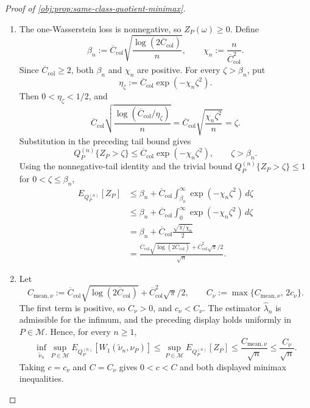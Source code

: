 \begin{proof}[Proof of \cref{obj:prop:same-class-quotient-minimax}]
\begin{enumerate}
\item
The one-Wasserstein loss is nonnegative, so \(Z_P(\omega)\ge0\). Define
\[
  \beta_n:=
  \overline C_{\mathrm{col}}
  \sqrt{\frac{\log(2\overline C_{\mathrm{col}})}{n}},
  \qquad
  \chi_n:=
  \frac{n}{\overline C_{\mathrm{col}}^2}.
\]
Since \(\overline C_{\mathrm{col}}\ge2\), both \(\beta_n\) and \(\chi_n\) are positive. For every \(\zeta>\beta_n\), put
\[
  \eta_\zeta:=
  \overline C_{\mathrm{col}}\exp(-\chi_n\zeta^2).
\]
Then \(0<\eta_\zeta<1/2\), and
\[
  \overline C_{\mathrm{col}}
  \sqrt{\frac{\log(\overline C_{\mathrm{col}}/\eta_\zeta)}{n}}
  =
  \overline C_{\mathrm{col}}
  \sqrt{\frac{\chi_n\zeta^2}{n}}
  =
  \zeta .
\]
Substitution in the preceding tail bound gives
\[
  Q_P^{(n)}\{Z_P>\zeta\}
  \le
  \overline C_{\mathrm{col}}\exp(-\chi_n\zeta^2),
  \qquad \zeta>\beta_n .
\]
Using the nonnegative-tail identity and the trivial bound
\(Q_P^{(n)}\{Z_P>\zeta\}\le1\) for \(0<\zeta\le\beta_n\),
\[
\begin{aligned}
  E_{Q_P^{(n)}}[Z_P]
  &\le
  \beta_n+
  \overline C_{\mathrm{col}}
  \int_{\beta_n}^{\infty}\exp(-\chi_n\zeta^2)\,d\zeta  \\
  &\le
  \beta_n+
  \overline C_{\mathrm{col}}
  \int_{0}^{\infty}\exp(-\chi_n\zeta^2)\,d\zeta  \\
  &=
  \beta_n+
  \overline C_{\mathrm{col}}\frac{\sqrt{\pi/\chi_n}}{2}  \\
  &=
  \frac{
    \overline C_{\mathrm{col}}\sqrt{\log(2\overline C_{\mathrm{col}})}
    +
    \overline C_{\mathrm{col}}^2\sqrt{\pi}/2
  }{\sqrt n}.
\end{aligned}
\]

\item
Let
\[
  C_{\mathrm{mean},\nu}:=
  \overline C_{\mathrm{col}}\sqrt{\log(2\overline C_{\mathrm{col}})}
  +
  \overline C_{\mathrm{col}}^2\sqrt{\pi}/2,
  \qquad
  C_{\nu}:=\max\{C_{\mathrm{mean},\nu},\,2c_{\nu}\}.
\]
The first term is positive, so \(C_{\nu}>0\), and \(c_{\nu}<C_{\nu}\). The estimator \(\widehat\lambda_n\) is admissible for the infimum, and the preceding display holds uniformly in \(P\in\mathcal M\). Hence, for every \(n\ge1\),
\[
  \inf_{\widetilde\nu_n}
  \sup_{P\in\mathcal M}
  E_{Q_P^{(n)}}\!\left[
    W_1\!\left(\widetilde\nu_n,\nu_P\right)
  \right]
  \le
  \sup_{P\in\mathcal M} E_{Q_P^{(n)}}[Z_P]
  \le
  \frac{C_{\mathrm{mean},\nu}}{\sqrt n}
  \le
  \frac{C_{\nu}}{\sqrt n}.
\]
Taking \(c=c_{\nu}\) and \(C=C_{\nu}\) gives \(0<c<C\) and both displayed minimax inequalities.
\end{enumerate}
\end{proof}

